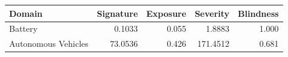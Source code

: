 \begin{tabular}{lrrrr}
\toprule
Domain & Signature & Exposure & Severity & Blindness \\
\midrule
Battery & 0.1033 & 0.055 & 1.8883 & 1.000 \\
Autonomous Vehicles & 73.0536 & 0.426 & 171.4512 & 0.681 \\
\bottomrule
\end{tabular}